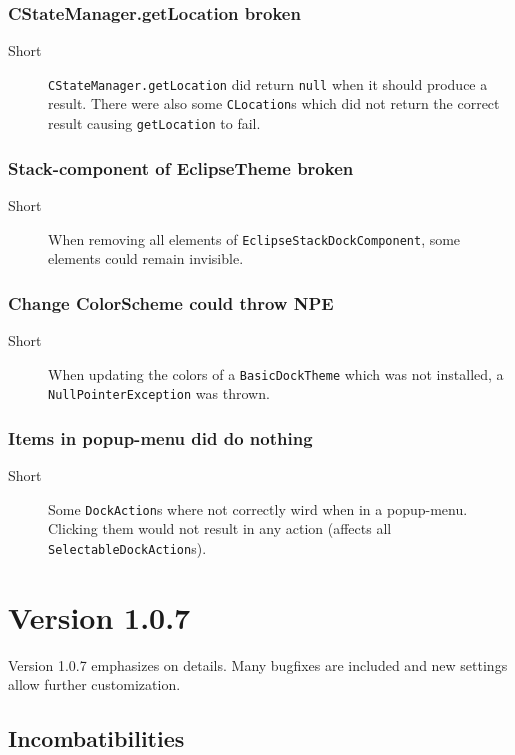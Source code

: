 \documentclass[a4paper,10pt]{article}
\newcommand{\src}[1]{\lstinline[basicstyle=\normalsize\ttfamily,keywordstyle=\normalsize\ttfamily,identifierstyle=\normalsize\ttfamily]|#1|}
\newcommand{\short}{\item[Short]}
\begin{document}
\subsubsection{CStateManager.getLocation broken}
\begin{description}
 \short \src{CStateManager.getLocation} did return \src{null} when it should produce a result. There were also some \src{CLocation}s which did not return the correct result causing \src{getLocation} to fail.
\end{description}

\subsubsection{Stack-component of EclipseTheme broken}
\begin{description}
 \short When removing all elements of \src{EclipseStackDockComponent}, some elements could remain invisible.
\end{description}

\subsubsection{Change ColorScheme could throw NPE}
\begin{description}
 \short When updating the colors of a \src{BasicDockTheme} which was not installed, a \src{NullPointerException} was thrown.
\end{description}

\subsubsection{Items in popup-menu did do nothing}
\begin{description}
 \short Some \src{DockAction}s where not correctly wird when in a popup-menu. Clicking them would not result in any action (affects all \\\src{SelectableDockAction}s).
\end{description}

\section{Version 1.0.7}
Version 1.0.7 emphasizes on details. Many bugfixes are included and new settings allow further customization.

\subsection{Incombatibilities}
\end{document}
